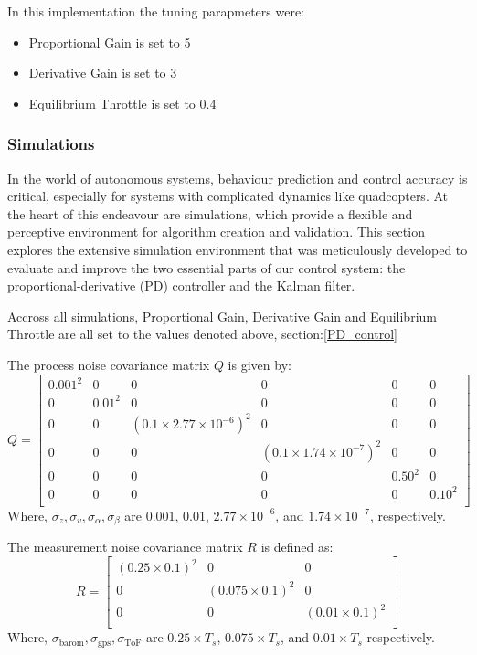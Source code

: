 \documentclass{article}
\begin{document}
In this implementation the tuning parapmeters were: 
\begin{itemize}
  \item Proportional Gain is set to 5 
  \item Derivative Gain is set to 3 
  \item Equilibrium Throttle is set to 0.4
\end{itemize}

\subsubsection{Simulations}\label{PD_simulations} In the world of autonomous
systems, behaviour prediction and control accuracy is critical, especially for
systems with complicated dynamics like quadcopters. At the heart of this
endeavour are simulations, which provide a flexible and perceptive environment
for algorithm creation and validation. This section explores the extensive
simulation environment that was meticulously developed to evaluate and improve
the two essential parts of our control system: the proportional-derivative (PD)
controller and the Kalman filter.

Accross all simulations, Proportional Gain, Derivative Gain and Equilibrium
Throttle are all set to the values denoted above, section:\ref{PD_control}

The process noise covariance matrix \( Q \) is given by:
\begin{equation}
Q = \begin{bmatrix}
0.001^2 & 0 & 0 & 0 & 0 & 0 \\
0 & 0.01^2 & 0 & 0 & 0 & 0 \\
0 & 0 & (0.1 \times 2.77 \times 10^{-6})^2 & 0 & 0 & 0 \\
0 & 0 & 0 & (0.1 \times 1.74 \times 10^{-7})^2 & 0 & 0 \\
0 & 0 & 0 & 0 & 0.50^2 & 0 \\
0 & 0 & 0 & 0 & 0 & 0.10^2 \\
\end{bmatrix}
\end{equation}
Where, \( \sigma_z, \sigma_v, \sigma_\alpha, \sigma_\beta \) are 0.001, 0.01, \(
2.77 \times 10^{-6} \), and \( 1.74 \times 10^{-7} \), respectively.
\bigskip

The measurement noise covariance matrix \( R \) is defined as:
\begin{equation}
R = \begin{bmatrix}
(0.25 \times 0.1)^2 & 0 & 0 \\
0 & (0.075 \times 0.1)^2 & 0 \\
0 & 0 & (0.01 \times 0.1)^2 \\
\end{bmatrix}
\end{equation}
Where, \( \sigma_{\text{barom}}, \sigma_{\text{gps}}, \sigma_{\text{ToF}} \) are
\( 0.25 \times T_s \), \( 0.075 \times T_s \), and \( 0.01 \times T_s \)
respectively.
\end{document}
